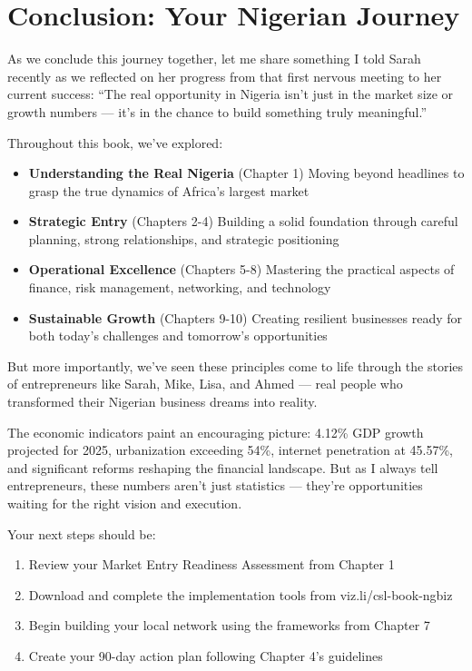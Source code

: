 \section{Conclusion: Your Nigerian Journey}\label{sec:conclusion}

As we conclude this journey together, let me share something I told Sarah recently as we reflected on her progress from that first nervous meeting to her current success: ``The real opportunity in Nigeria isn't just in the market size or growth numbers --- it's in the chance to build something truly meaningful.''

Throughout this book, we've explored:

\begin{itemize}
    \item \textbf{Understanding the Real Nigeria} (Chapter 1)
    Moving beyond headlines to grasp the true dynamics of Africa's largest market

    \item \textbf{Strategic Entry} (Chapters 2-4)
    Building a solid foundation through careful planning, strong relationships, and strategic positioning

    \item \textbf{Operational Excellence} (Chapters 5-8)
    Mastering the practical aspects of finance, risk management, networking, and technology

    \item \textbf{Sustainable Growth} (Chapters 9-10)
    Creating resilient businesses ready for both today's challenges and tomorrow's opportunities
\end{itemize}

But more importantly, we've seen these principles come to life through the stories of entrepreneurs like Sarah, Mike, Lisa, and Ahmed --- real people who transformed their Nigerian business dreams into reality.

The economic indicators paint an encouraging picture: 4.12\% GDP growth projected for 2025, urbanization exceeding 54\%, internet penetration at 45.57\%, and significant reforms reshaping the financial landscape. But as I always tell entrepreneurs, these numbers aren't just statistics --- they're opportunities waiting for the right vision and execution.

Your next steps should be:

\begin{enumerate}
    \item Review your Market Entry Readiness Assessment from Chapter 1
    \item Download and complete the implementation tools from viz.li/csl-book-ngbiz
    \item Begin building your local network using the frameworks from Chapter 7
    \item Create your 90-day action plan following Chapter 4's guidelines
\end{enumerate}

